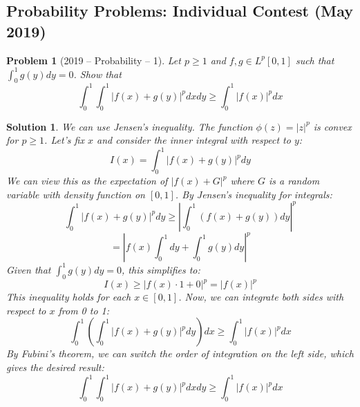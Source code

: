 \documentclass[12pt]{amsart}
\newtheorem{problem}{Problem}
\newtheorem*{solution}{Solution}
\begin{document}
\subsection*{Probability Problems: Individual Contest (May 2019)}
\begin{problem}[2019 -- Probability -- 1]
Let $p \geq 1$ and $f, g \in L^p[0,1]$ such that $\int_0^1 g(y) d y=0$. Show that
$$
\int_0^1 \int_0^1|f(x)+g(y)|^p d x d y \geqslant \int_0^1|f(x)|^p d x
$$
\end{problem}
\begin{solution}
We can use Jensen's inequality. The function $\phi(z) = |z|^p$ is convex for $p \ge 1$.
Let's fix $x$ and consider the inner integral with respect to $y$:
$$ I(x) = \int_0^1 |f(x)+g(y)|^p dy $$
We can view this as the expectation of $|f(x)+G|^p$ where $G$ is a random variable with density function on $[0,1]$.
By Jensen's inequality for integrals:
$$ \int_0^1 |f(x)+g(y)|^p dy \ge \left| \int_0^1 (f(x)+g(y)) dy \right|^p $$
$$ = \left| f(x)\int_0^1 dy + \int_0^1 g(y) dy \right|^p $$
Given that $\int_0^1 g(y)dy = 0$, this simplifies to:
$$ I(x) \ge |f(x) \cdot 1 + 0|^p = |f(x)|^p $$
This inequality holds for each $x \in [0,1]$. Now, we can integrate both sides with respect to $x$ from 0 to 1:
$$ \int_0^1 \left( \int_0^1 |f(x)+g(y)|^p dy \right) dx \ge \int_0^1 |f(x)|^p dx $$
By Fubini's theorem, we can switch the order of integration on the left side, which gives the desired result:
$$ \int_0^1 \int_0^1|f(x)+g(y)|^p d x d y \geqslant \int_0^1|f(x)|^p d x $$
\end{solution}
\end{document}
